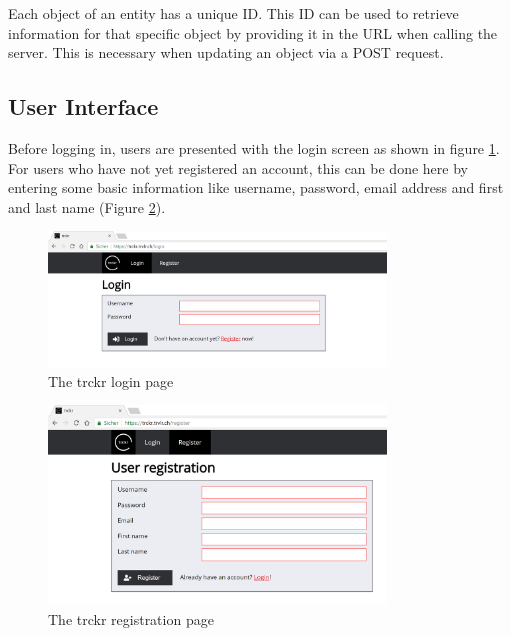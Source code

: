 \documentclass[bibliography=totoc, listof=totocnumbered]{scrartcl}
\begin{document}
Each object of an entity has a unique ID. This ID can be used to retrieve
information for that specific object by providing it in the URL when calling the
server. This is necessary when updating an object via a POST request.

\subsection{User Interface}

Before logging in, users are presented with the login screen as shown in figure
\ref{fig:trckr-login}. For users who have not yet registered an account, this
can be done here by entering some basic information like username, password,
email address and first and last name (Figure \ref{fig:trckr-register}).

\begin{figure}[h]
    \includegraphics[width=0.8\textwidth]{trckr-login}
    \caption{The trckr login page}
    \label{fig:trckr-login}
\end{figure}

\begin{figure}[h]
    \includegraphics[width=0.8\textwidth]{trckr-register}
    \caption{The trckr registration page}
    \label{fig:trckr-register}
\end{figure}
\end{document}
